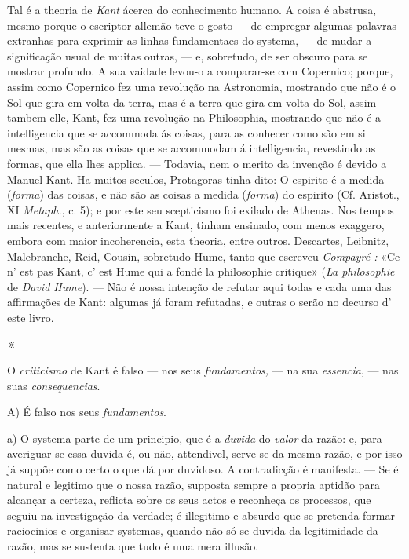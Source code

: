 Tal é a theoria de \emph{Kant} ácerca do conhecimento humano. A coisa é abstrusa, mesmo porque o escriptor allemão teve o gosto --- de empregar algumas palavras extranhas para exprimir as linhas fundamentaes do systema, --- de mudar a significação usual de muitas outras, --- e, sobretudo, de ser obscuro para se mostrar profundo. A sua vaidade levou-o a comparar-se com Copernico; porque, assim como Copernico fez uma revolução na Astronomia, mostrando que não é o Sol que gira em volta da terra, mas é a terra que gira em volta do Sol, assim tambem elle, Kant, fez uma revolução na Philosophia, mostrando que não é a intelligencia que se accommoda ás coisas, para as conhecer como são em si mesmas, mas são as coisas que se accommodam á intelligencia, revestindo as formas, que ella lhes applica. --- Todavia, nem o merito da invenção é devido a Manuel Kant. Ha muitos seculos, Protagoras tinha dito: O espirito é a medida (\emph{forma}) das coisas, e não são as coisas a medida (\emph{forma}) do espirito (Cf. Aristot., XI \emph{Metaph.}, c. 5); e por este seu scepticismo foi exilado de Athenas. Nos tempos mais recentes, e anteriormente a Kant, tinham ensinado, com menos exaggero, embora com maior incoherencia, esta theoria, entre outros. Descartes, Leibnitz, Malebranche, Reid, Cousin, sobretudo Hume, tanto que escreveu \emph{Compayré :} «Ce n' est pas Kant, c' est Hume qui a fondé la philosophie critique» (\emph{La philosophie} de \emph{David Hume}). --- Não é nossa intenção de refutar aqui todas e cada uma das affirmações de Kant: algumas já foram refutadas, e outras o serão no decurso d' este livro.

※

O \emph{criticismo} de Kant é falso --- nos seus \emph{fundamentos,} --- na sua \emph{essencia}, --- nas suas \emph{consequencias}.

A) É falso nos seus \emph{fundamentos}.

a) O systema parte de um principio, que é a \emph{duvida} do \emph{valor} da razão: e, para averiguar se essa duvida é, ou não, attendivel, serve-se da mesma razão, e por isso já suppõe como certo o que dá por duvidoso. A contradicção é manifesta. --- Se é natural e legitimo que o nossa razão, supposta sempre a propria aptidão para alcançar a certeza, reflicta sobre os seus actos e reconheça os processos, que seguiu na investigação da verdade; é illegitimo e absurdo que se pretenda formar raciocinios e organisar systemas, quando não só se duvida da legitimidade da razão, mas se sustenta que tudo é uma mera illusão.

